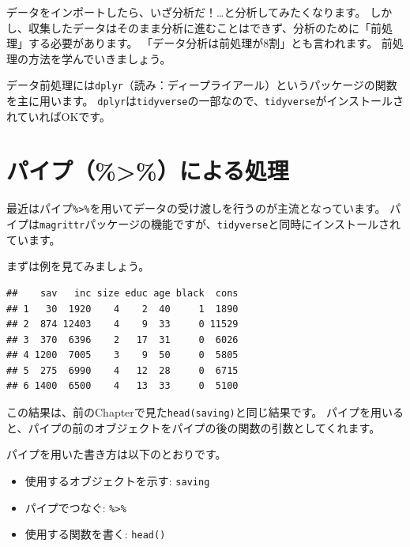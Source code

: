 \documentclass[]{book}
\newenvironment{Shaded}{\begin{snugshade}}{\end{snugshade}}
\newcommand{\KeywordTok}[1]{\textcolor[rgb]{0.13,0.29,0.53}{\textbf{#1}}}
\newcommand{\StringTok}[1]{\textcolor[rgb]{0.31,0.60,0.02}{#1}}
\newcommand{\OperatorTok}[1]{\textcolor[rgb]{0.81,0.36,0.00}{\textbf{#1}}}
\newcommand{\NormalTok}[1]{#1}
\providecommand{\tightlist}{%
  \setlength{\itemsep}{0pt}\setlength{\parskip}{0pt}}
\begin{document}
データをインポートしたら、いざ分析だ！\ldots{}と分析してみたくなります。
しかし、収集したデータはそのまま分析に進むことはできず、分析のために「前処理」する必要があります。
「データ分析は前処理が8割」とも言われます。
前処理の方法を学んでいきましょう。

データ前処理には\texttt{dplyr}（読み：ディープライアール）というパッケージの関数を主に用います。
\texttt{dplyr}は\texttt{tidyverse}の一部なので、\texttt{tidyverse}がインストールされていればOKです。

\section{パイプ（\%\textgreater{}\%）による処理}\label{ux30d1ux30a4ux30d7ux306bux3088ux308bux51e6ux7406}

最近はパイプ\texttt{\%\textgreater{}\%}を用いてデータの受け渡しを行うのが主流となっています。
パイプは\texttt{magrittr}パッケージの機能ですが、\texttt{tidyverse}と同時にインストールされています。

まずは例を見てみましょう。

\begin{Shaded}
\end{Shaded}

\begin{verbatim}
##    sav   inc size educ age black  cons
## 1   30  1920    4    2  40     1  1890
## 2  874 12403    4    9  33     0 11529
## 3  370  6396    2   17  31     0  6026
## 4 1200  7005    3    9  50     0  5805
## 5  275  6990    4   12  28     0  6715
## 6 1400  6500    4   13  33     0  5100
\end{verbatim}

この結果は、前のChapterで見た\texttt{head(saving)}と同じ結果です。
パイプを用いると、パイプの前のオブジェクトをパイプの後の関数の引数としてくれます。

パイプを用いた書き方は以下のとおりです。

\begin{itemize}
\tightlist
\item
  使用するオブジェクトを示す: \texttt{saving}
\item
  パイプでつなぐ: \texttt{\%\textgreater{}\%}
\item
  使用する関数を書く: \texttt{head()}
\end{itemize}
\end{document}
